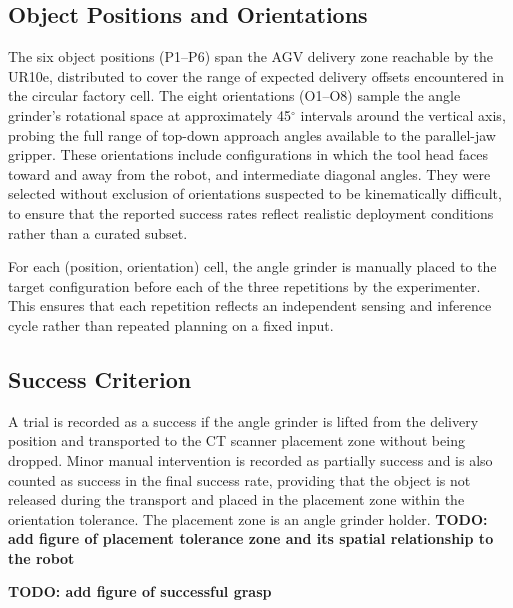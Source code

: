 \documentclass[12pt, a4paper]{report}
\begin{document}
\subsection{Object Positions and Orientations}

The six object positions (P1--P6) span the AGV delivery zone reachable by the UR10e, distributed to cover the range of expected delivery offsets encountered in the circular factory cell. The eight orientations (O1--O8) sample the angle grinder's rotational space at approximately 45$^\circ$ intervals around the vertical axis, probing the full range of top-down approach angles available to the parallel-jaw gripper. These orientations include configurations in which the tool head faces toward and away from the robot, and intermediate diagonal angles. They were selected without exclusion of orientations suspected to be kinematically difficult, to ensure that the reported success rates reflect realistic deployment conditions rather than a curated subset.

For each (position, orientation) cell, the angle grinder is manually placed to the target configuration before each of the three repetitions by the experimenter. This ensures that each repetition reflects an independent sensing and inference cycle rather than repeated planning on a fixed input.

\subsection{Success Criterion}
\label{sec:success-criterion}

A trial is recorded as a success if the angle grinder is lifted from the delivery position and transported to the CT scanner placement zone without being dropped. Minor manual intervention is recorded as partially success and is also counted as success in the final success rate, providing that the object is not released during the transport and placed in the placement zone within the orientation tolerance. The placement zone is an angle grinder holder. \textbf{TODO: add figure of placement tolerance zone and its spatial relationship to the robot}

\textbf{TODO: add figure of successful grasp}
\end{document}
